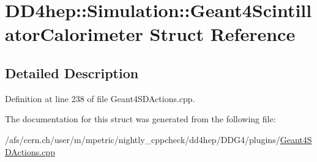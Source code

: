 \hypertarget{struct_d_d4hep_1_1_simulation_1_1_geant4_scintillator_calorimeter}{
\section{DD4hep::Simulation::Geant4ScintillatorCalorimeter Struct Reference}
\label{struct_d_d4hep_1_1_simulation_1_1_geant4_scintillator_calorimeter}
}


\subsection{Detailed Description}


Definition at line 238 of file Geant4SDActions.cpp.

The documentation for this struct was generated from the following file:\begin{DoxyCompactItemize}
\item 
/afs/cern.ch/user/m/mpetric/nightly\_\-cppcheck/dd4hep/DDG4/plugins/\hyperlink{_geant4_s_d_actions_8cpp}{Geant4SDActions.cpp}\end{DoxyCompactItemize}
